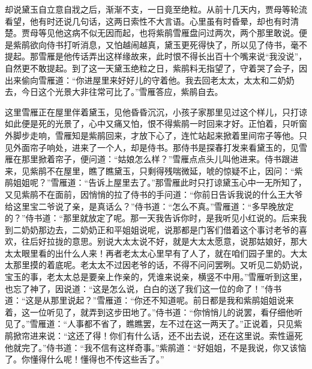 

\begin{parag}
    却说黛玉自立意自戕之后，渐渐不支，一日竟至绝粒。从前十几天内，贾母等轮流看望，他有时还说几句话，这两日索性不大言语。心里虽有时昏晕，却也有时清楚。贾母等见他这病不似无因而起，也将紫鹃雪雁盘问过两次，两个那里敢说。便是紫鹃欲向侍书打听消息，又怕越闹越真，黛玉更死得快了，所以见了侍书，毫不提起。那雪雁是他传话弄出这样缘故来，此时恨不得长出百十个嘴来说“我没说”，自然更不敢提起。到了这一天黛玉绝粒之日，紫鹃料无指望了，守着哭了会子，因出来偷向雪雁道：“你进屋里来好好儿的守着他。我去回老太太，太太和二奶奶去，今日这个光景大非往常可比了。”雪雁答应，紫鹃自去。
\end{parag}


\begin{parag}
    这里雪雁正在屋里伴着黛玉，见他昏昏沉沉，小孩子家那里见过这个样儿，只打谅如此便是死的光景了，心中又痛又怕，恨不得紫鹃一时回来才好。正怕着，只听窗外脚步走响，雪雁知是紫鹃回来，才放下心了，连忙站起来掀着里间帘子等他。只见外面帘子响处，进来了一个人，却是侍书。那侍书是探春打发来看黛玉的，见雪雁在那里掀着帘子，便问道：“姑娘怎么样？”雪雁点点头儿叫他进来。侍书跟进来，见紫鹃不在屋里，瞧了瞧黛玉，只剩得残喘微延，唬的惊疑不止，因问：“紫鹃姐姐呢？”雪雁道：“告诉上屋里去了。”那雪雁此时只打谅黛玉心中一无所知了，又见紫鹃不在面前，因悄悄的拉了侍书的手问道：“你前日告诉我说的什么王大爷给这里宝二爷说了亲，是真话么？”侍书道：“怎么不真。”雪雁道：“多早晚放定的？”侍书道：“那里就放定了呢。那一天我告诉你时，是我听见小红说的。后来我到二奶奶那边去，二奶奶正和平姐姐说呢，说那都是门客们借着这个事讨老爷的喜欢，往后好拉拢的意思。别说大太太说不好，就是大太太愿意，说那姑娘好，那大太太眼里看的出什么人来！再者老太太心里早有了人了，就在咱们园子里的。大太太那里摸的着底呢。老太太不过因老爷的话，不得不问问罢咧。又听见二奶奶说，宝玉的事，老太太总是要亲上作亲的，凭谁来说亲，横竖不中用。”雪雁听到这里，也忘了神了，因说道：“这是怎么说，白白的送了我们这一位的命了！”侍书道：“这是从那里说起？”雪雁道：“你还不知道呢。前日都是我和紫鹃姐姐说来着，这一位听见了，就弄到这步田地了。”侍书道：“你悄悄儿的说罢，看仔细他听见了。”雪雁道：“人事都不省了，瞧瞧罢，左不过在这一两天了。”正说着，只见紫鹃掀帘进来说：“这还了得！你们有什么话，还不出去说，还在这里说。索性逼死他就完了。”侍书道：“我不信有这样奇事。”紫鹃道：“好姐姐，不是我说，你又该恼了。你懂得什么呢！懂得也不传这些舌了。”
\end{parag}


